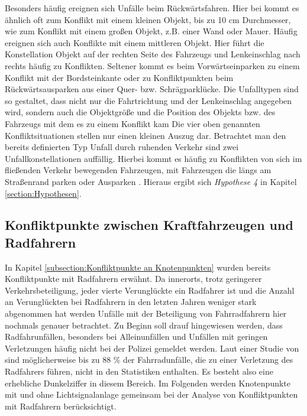 Besonders häufig ereignen sich Unfälle beim Rückwärtsfahren. Hier bei kommt es ähnlich oft zum Konflikt mit einem kleinen Objekt, bis zu 10 cm Durchmesser, wie zum Konflikt mit einem großen Objekt, z.B. einer Wand oder Mauer. Häufig ereignen sich auch Konflikte mit einem mittleren Objekt. Hier führt die Konstellation Objekt auf der rechten Seite des Fahrzeugs und Lenkeinschlag nach rechts häufig zu Konflikten. Seltener kommt es beim Vorwärtseinparken zu einem Konflikt mit der Bordsteinkante oder zu Konfliktpunkten beim Rückwärtsausparken aus einer Quer- bzw. Schrägparklücke. Die Unfalltypen sind so gestaltet, dass nicht nur die Fahrtrichtung und der Lenkeinschlag angegeben wird, sondern auch die Objektgröße und die Position des Objekts bzw. des Fahrzeugs mit dem es zu einem Konflikt kam \parencite[S. 58-61]{Gschwendtner.2015} Die vier oben genannten Konfliktsituationen stellen nur einen kleinen Auszug dar. Betrachtet man den bereits definierten Typ Unfall durch ruhenden Verkehr sind zwei Unfallkonstellationen auffällig. Hierbei kommt es häufig zu Konflikten von sich im fließenden Verkehr bewegenden Fahrzeugen, mit  Fahrzeugen die längs am Straßenrand parken oder Ausparken \parencite[S. 53]{Vollrath.2006}. Hieraus ergibt sich \textit{Hypothese 4} in Kapitel \ref{section:Hypothesen}.

\subsection{Konfliktpunkte zwischen Kraftfahrzeugen und Radfahrern}
In Kapitel \ref{subsection:Konfliktpunkte an Knotenpunkten} wurden bereits Konfliktpunkte mit Radfahrern erwähnt. Da innerorts, trotz geringerer Verkehrsbeteiligung, jeder vierte Verunglückte ein Radfahrer ist \parencite[S. 303]{Schreiber.2014b} und die Anzahl an Verunglückten bei Radfahrern in den letzten Jahren weniger stark abgenommen hat \parencite[S. 7]{Below.2016} werden Unfälle mit der Beteiligung von Fahrradfahrern hier nochmals genauer betrachtet. Zu Beginn soll drauf hingewiesen werden, dass Radfahrunfällen, besonders bei Alleinunfällen und Unfällen mit geringen Verletzungen häufig nicht bei der Polizei gemeldet werden. Laut einer Studie von \Textcite[S. 80]{Below.2016} sind möglicherweise bis zu 88 \% der Fahrradunfälle, die zu einer Verletzung des Radfahrers führen, nicht in den Statistiken enthalten. Es besteht also eine erhebliche Dunkelziffer in diesem Bereich. Im Folgenden werden Knotenpunkte mit und ohne Lichtsignalanlage gemeinsam bei der Analyse von Konfliktpunkten mit Radfahrern berücksichtigt.

